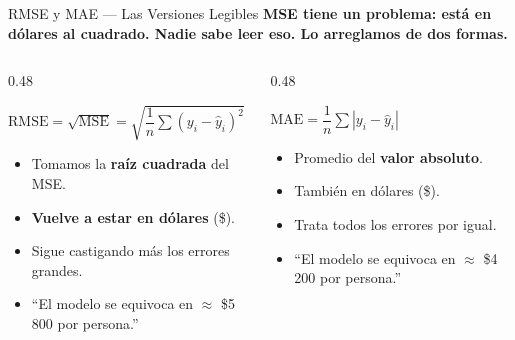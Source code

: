\documentclass[aspectratio=169, 11pt]{beamer}
\begin{document}
\begin{frame}[shrink=5]{RMSE y MAE --- Las Versiones Legibles}
  \vspace{-4pt}
  {\footnotesize\color{arcaDark}\bfseries
    MSE tiene un problema: está en \textbf{dólares al cuadrado}. Nadie
    sabe leer eso. Lo arreglamos de dos formas.}

  \vspace{6pt}
  \begin{columns}[T]
    \begin{column}{0.48\textwidth}
      \begin{center}
        \begin{tcolorbox}[colback=arcaGray, colframe=arcaRed, boxrule=0.8pt,
                          arc=3pt, width=\textwidth]
        \centering
        \footnotesize
        $\text{RMSE} = \sqrt{\text{MSE}} = \sqrt{\dfrac{1}{n}\sum(y_i - \hat{y}_i)^2}$
        \end{tcolorbox}
      \end{center}
      \vspace{4pt}
      {\scriptsize
      \begin{itemize}\setlength{\itemsep}{4pt}
        \item Tomamos la \textbf{raíz cuadrada} del MSE.
        \item \textbf{Vuelve a estar en dólares} (\$).
        \item Sigue castigando más los errores grandes.
        \item ``El modelo se equivoca en $\approx$ \$5\,800 por persona.''
      \end{itemize}
      }
    \end{column}

    \begin{column}{0.48\textwidth}
      \begin{center}
        \begin{tcolorbox}[colback=arcaGray, colframe=arcaRed, boxrule=0.8pt,
                          arc=3pt, width=\textwidth]
        \centering
        \footnotesize
        $\text{MAE} = \dfrac{1}{n}\sum |y_i - \hat{y}_i|$
        \end{tcolorbox}
      \end{center}
      \vspace{4pt}
      {\scriptsize
      \begin{itemize}\setlength{\itemsep}{4pt}
        \item Promedio del \textbf{valor absoluto}.
        \item También en dólares (\$).
        \item Trata todos los errores por igual.
        \item ``El modelo se equivoca en $\approx$ \$4\,200 por persona.''
      \end{itemize}
      }
    \end{column}
  \end{columns}


\end{frame}
\end{document}
